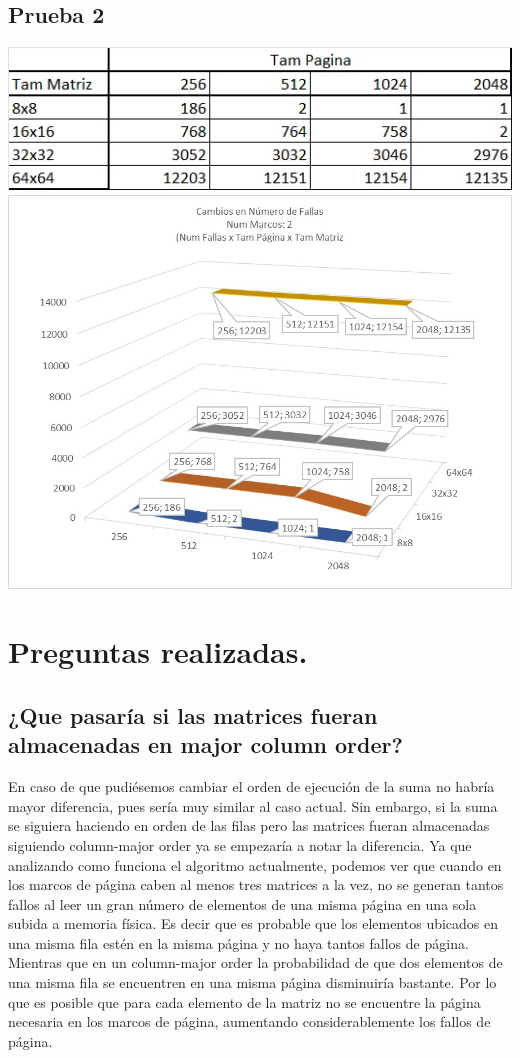 \documentclass[a4paper]{article}
\begin{document}
\subsection{Prueba 2}
\includegraphics{2-1.jpeg}
\includegraphics[scale=0.55]{2-2.jpeg}


\section{Preguntas realizadas.}

\subsection{¿Que pasaría si las matrices fueran almacenadas en major column order?}
En caso de que pudiésemos cambiar el orden de ejecución de la suma no habría mayor diferencia, pues sería muy similar al caso actual. Sin embargo, si la suma se siguiera haciendo en orden de las filas pero las matrices fueran almacenadas siguiendo column-major order ya se empezaría a notar la diferencia. Ya que analizando como funciona el algoritmo actualmente, podemos ver que cuando en los marcos de página caben al menos tres matrices a la vez, no se generan tantos fallos al leer un gran número de elementos de una misma página en una sola subida a memoria física. Es decir que es probable que los elementos ubicados en una misma fila estén en la misma página y no haya tantos fallos de página. Mientras que en un column-major order la probabilidad de que dos elementos de una misma fila se encuentren en una misma página disminuiría bastante. Por lo que es posible que para cada elemento de la matriz no se encuentre la página necesaria en los marcos de página, aumentando considerablemente los fallos de página.
\end{document}
